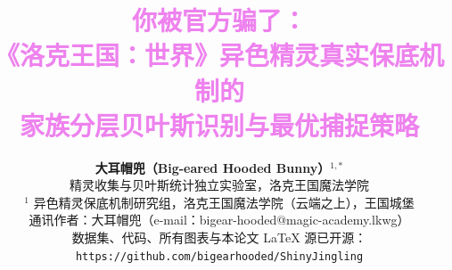 \documentclass[journal]{IEEEtran}
\begin{document}
\title{\vspace*{0.5cm}\textcolor{violet}{你被官方骗了：\\《洛克王国：世界》异色精灵真实保底机制的\\家族分层贝叶斯识别与最优捕捉策略}\vspace*{0.5cm}}

\author{\textbf{大耳帽兜（Big-eared Hooded Bunny）$^{1,*}$}\\
    \vspace*{0.1cm}
    精灵收集与贝叶斯统计独立实验室，洛克王国魔法学院 \\
    \vspace*{0.2cm}
    \small
    $^{1}$ 异色精灵保底机制研究组，洛克王国魔法学院（云端之上），王国城堡 \\
    \vspace*{0.1cm}
    通讯作者：大耳帽兜（e-mail：bigear-hooded@magic-academy.lkwg）\\
    \vspace*{0.1cm}
    数据集、代码、所有图表与本论文 LaTeX 源已开源：\texttt{https://github.com/bigearhooded/ShinyJingling}\\
    \normalsize
}
\end{document}
